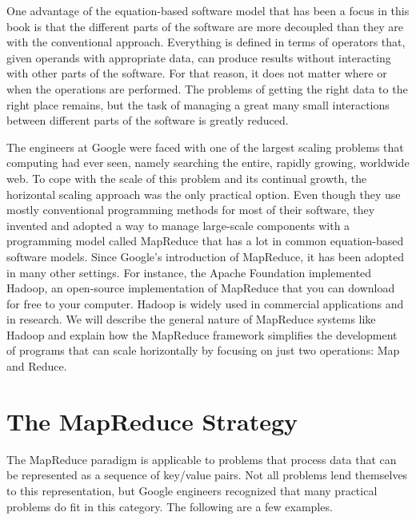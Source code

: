 One advantage of the equation-based software model
that has been a focus in this book is that the
different parts of the software are more decoupled
than they are with the conventional approach.
Everything is defined in terms of operators
that, given operands with appropriate data,
can produce results without
interacting with other parts of the software.
For that reason, it does not matter where or when
the operations are performed.
The problems of getting the right data to the right place
remains, but the task of managing a great many small interactions
between different parts of the software is greatly reduced.

The engineers at Google were faced with one of the largest
scaling problems that computing had ever seen,
namely searching the entire, rapidly growing, worldwide web.
To cope with the scale of this problem and its continual growth,
the horizontal scaling approach was the only practical option.
Even though they use mostly conventional programming methods
for most of their software,
they invented and adopted a way to manage large-scale components
with a programming model called MapReduce
that has a lot in common equation-based software models.
Since Google's introduction of MapReduce,
it has been adopted in many other settings.  For
instance, the Apache Foundation 
implemented Hadoop, an
open-source implementation of MapReduce that you can
download for free to your computer.
Hadoop is widely used in commercial applications and in research.
We will describe the general nature of
MapReduce systems like Hadoop
and explain how the MapReduce framework simplifies the
development of programs that can scale horizontally by
focusing on just two operations: Map and Reduce.

\section{The MapReduce Strategy}

The \textsf{MapReduce} paradigm 
is applicable to problems that process
data that can be represented as a sequence of 
key/value pairs.
Not all problems lend themselves to this representation,
but Google engineers recognized that many practical
problems do fit in this category.  
The following are a few examples.

